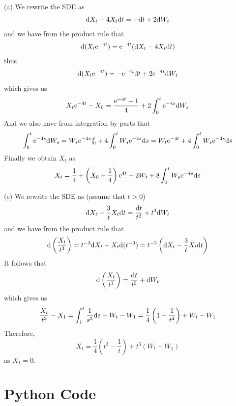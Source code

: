 \documentclass{homework}
\begin{document}
    \problem
    \begin{subproblem}
        \item[(a)]
        We rewrite the SDE as
        \[\mathrm d X_t-4X_t\mathrm d t=-\mathrm d t+2\mathrm d W_t\]
        and we have from the product rule that
        \[\mathrm d(X_t\mathrm e^{-4t})=\mathrm e^{-4t}(\mathrm d X_t-4X_t\mathrm d t)\]
        thus
        \[\mathrm d(X_t\mathrm e^{-4t})=-\mathrm e^{-4t}\mathrm d t+2\mathrm e^{-4t}\mathrm d W_t\]
        which gives us
        \[X_t\mathrm e^{-4t}-X_0=\frac{\mathrm e^{-4t}-1}{4}+2\int_0^t\mathrm e^{-4s}\mathrm d W_s\]
        And we also have from integration by parts that
        \[\int_0^t\mathrm e^{-4s}\mathrm d W_s=W_s\mathrm e^{-4s}|_0^t+4\int_0^tW_s\mathrm e^{-4s}\mathrm d s
        =W_t\mathrm e^{-4t}+4\int_0^tW_s\mathrm e^{-4s}\mathrm d s\]
        Finally we obtain $X_t$ as
        \[X_t=\frac{1}{4}+\left(X_0-\frac{1}{4}\right)\mathrm e^{4t}+2W_t+8\int_0^tW_s\mathrm e^{-4s}\mathrm d s\]

        \item[(e)]
        We rewrite the SDE as (assume that $t>0$)
        \[\mathrm d X_t-\frac{3}{t}X_t\mathrm d t=\frac{\mathrm d t}{t^2}+t^3\mathrm d W_t\]
        and we have from the product rule that
        \[\mathrm d\left(\frac{X_t}{t^3}\right)=t^{-3}\mathrm d X_t+X_t\mathrm d(t^{-3})
        =t^{-3}\left(\mathrm d X_t-\frac{3}{t}X_t\mathrm d t\right)\]
        It follows that
        \[\mathrm d\left(\frac{X_t}{t^3}\right)=\frac{\mathrm d t}{t^5}+\mathrm d W_t\]
        which gives us
        \[\frac{X_t}{t^3}-X_1=\int_1^t\frac{1}{s^5}\mathrm d s+W_t-W_1
        =\frac{1}{4}\left(1-\frac{1}{t^4}\right)+W_t-W_1\]
        Therefore,
        \[X_t=\frac{1}{4}\left(t^3-\frac{1}{t}\right)+t^3(W_t-W_1)\]
        as $X_1=0$.
    \end{subproblem}

    \appendix
    \section{Python Code}
    
\end{document}
